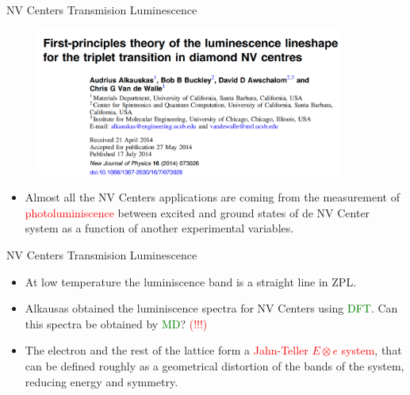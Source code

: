 \documentclass[11pt]{beamer}
\begin{document}
\begin{frame}{NV Centers Transmision Luminescence}
\begin{figure}
 \centering
    \includegraphics[width=0.9\textwidth]{pap8.png}
 \end{figure}
  \begin{itemize}
     \item Almost all the NV Centers applications are coming from the measurement of \textcolor{red}{photoluminiscence} between excited and ground states of de NV Center system as a function of another experimental variables.
 \end{itemize}
\end{frame}
\begin{frame}{NV Centers Transmision Luminescence}
  \begin{itemize}
    \item At low temperature the luminiscence band is a straight line in ZPL. 
    \item Alkausas obtained the luminiscence spectra for NV Centers using \textcolor{green}{DFT}. Can this spectra be obtained by \textcolor{green}{MD}? \textcolor{red}{(!!!)}
    \item The electron and the rest of the lattice form a \textcolor{red}{Jahn-Teller $E\otimes e$ system}, that can be defined roughly as a geometrical distortion of the bands of the system, reducing energy and symmetry.
 \end{itemize}
\end{frame}
\end{document}
